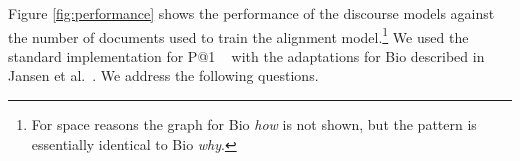 Figure \ref{fig:performance} shows the performance of the discourse models against the number of documents used to train the alignment model.\footnote{For space reasons the graph for Bio \emph{how} is not shown, but the pattern is essentially identical to Bio \emph{why}.}   We used the standard implementation for P@1 ~\cite{manning08} with the adaptations for Bio described in Jansen et al.~. We address the following questions.

